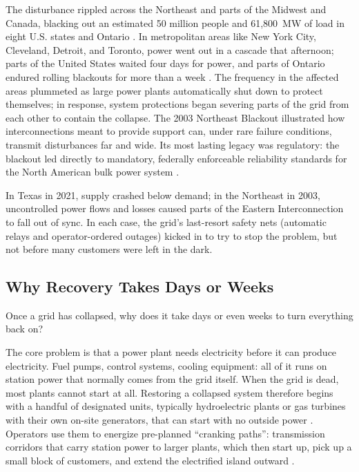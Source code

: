 The disturbance rippled across the Northeast and parts of the Midwest and Canada, blacking out an estimated 50 million people and 61{,}800~MW of load in eight U.S. states and Ontario \autocite{OutageTaskForce2004}. %
In metropolitan areas like New York City, Cleveland, Detroit, and Toronto, power went out in a cascade that afternoon; parts of the United States waited four days for power, and parts of Ontario endured rolling blackouts for more than a week \autocite{OutageTaskForce2004}. The frequency in the affected areas plummeted as large power plants automatically shut down to protect themselves; in response, system protections began severing parts of the grid from each other to contain the collapse. The 2003 Northeast Blackout illustrated how interconnections meant to provide support can, under rare failure conditions, transmit disturbances far and wide. Its most lasting legacy was regulatory: the blackout led directly to mandatory, federally enforceable reliability standards for the North American bulk power system \autocite{OutageTaskForce2004,EPAct2005}. %

In Texas in 2021, supply crashed below demand; in the Northeast in 2003, uncontrolled power flows and losses caused parts of the Eastern Interconnection to fall out of sync. In each case, the grid's last-resort safety nets (automatic relays and operator-ordered outages) kicked in to try to stop the problem, but not before many customers were left in the dark.

\subsection{Why Recovery Takes Days or Weeks}

Once a grid has collapsed, why does it take days or even weeks to turn everything back on?

The core problem is that a power plant needs electricity before it can produce electricity. Fuel pumps, control systems, cooling equipment: all of it runs on station power that normally comes from the grid itself. When the grid is dead, most plants cannot start at all. Restoring a collapsed system therefore begins with a handful of designated  units, typically hydroelectric plants or gas turbines with their own on-site generators, that can start with no outside power \autocite{NERCEOP005}. %
Operators use them to energize pre-planned ``cranking paths'': transmission corridors that carry station power to larger plants, which then start up, pick up a small block of customers, and extend the electrified island outward \autocite{NERCEOP005}.

